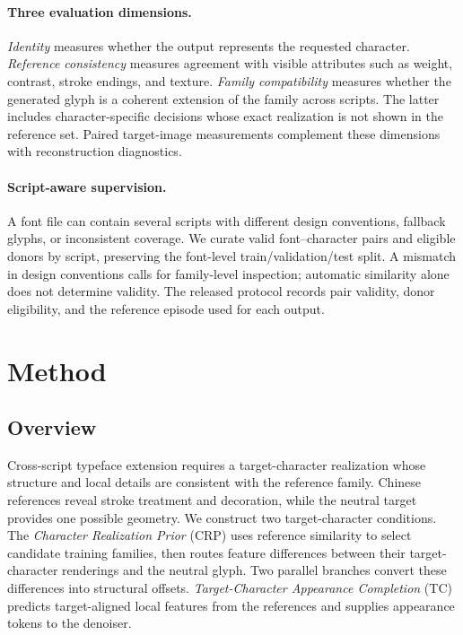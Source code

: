\documentclass{article}
\begin{document}
\paragraph{Three evaluation dimensions.}
\emph{Identity} measures whether the output represents the requested character.
\emph{Reference consistency} measures agreement with visible attributes such as weight, contrast, stroke endings, and texture.
\emph{Family compatibility} measures whether the generated glyph is a coherent extension of the family across scripts.
The latter includes character-specific decisions whose exact realization is not shown in the reference set.
Paired target-image measurements complement these dimensions with reconstruction diagnostics.

\paragraph{Script-aware supervision.}
A font file can contain several scripts with different design conventions, fallback glyphs, or inconsistent coverage.
We curate valid font--character pairs and eligible donors by script, preserving the font-level train/validation/test split.
A mismatch in design conventions calls for family-level inspection; automatic similarity alone does not determine validity.
The released protocol records pair validity, donor eligibility, and the reference episode used for each output.

\section{Method}
\label{sec:method}

\subsection{Overview}
\label{sec:method-overview}

Cross-script typeface extension requires a target-character realization whose structure and local details are consistent with the reference family.
Chinese references reveal stroke treatment and decoration, while the neutral target provides one possible geometry.
We construct two target-character conditions.
The \emph{Character Realization Prior} (CRP) uses reference similarity to select candidate training families, then routes feature differences between their target-character renderings and the neutral glyph.
Two parallel branches convert these differences into structural offsets.
\emph{Target-Character Appearance Completion} (TC) predicts target-aligned local features from the references and supplies appearance tokens to the denoiser.
\end{document}
